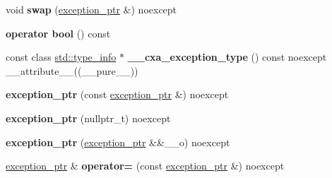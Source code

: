\begin{DoxyCompactItemize}
\item 
\hypertarget{classstd_1_1____exception__ptr_1_1exception__ptr_ad2b1448af31aeebd84f37b01322ce8b8}{void {\bfseries swap} (\hyperlink{classstd_1_1____exception__ptr_1_1exception__ptr}{exception\+\_\+ptr} \&) noexcept}\label{classstd_1_1____exception__ptr_1_1exception__ptr_ad2b1448af31aeebd84f37b01322ce8b8}

\item 
\hypertarget{classstd_1_1____exception__ptr_1_1exception__ptr_aea1a685ac3dc20da791647f4437117a7}{{\bfseries operator bool} () const }\label{classstd_1_1____exception__ptr_1_1exception__ptr_aea1a685ac3dc20da791647f4437117a7}

\item 
\hypertarget{classstd_1_1____exception__ptr_1_1exception__ptr_a0d0e52fc08e9ff94e5c93952a02a42db}{const class \hyperlink{classstd_1_1type__info}{std\+::type\+\_\+info} $\ast$ {\bfseries \+\_\+\+\_\+cxa\+\_\+exception\+\_\+type} () const noexcept \+\_\+\+\_\+attribute\+\_\+\+\_\+((\+\_\+\+\_\+pure\+\_\+\+\_\+))}\label{classstd_1_1____exception__ptr_1_1exception__ptr_a0d0e52fc08e9ff94e5c93952a02a42db}

\item 
\hypertarget{classstd_1_1____exception__ptr_1_1exception__ptr_a145c306627582b1267de080d7ed397bf}{{\bfseries exception\+\_\+ptr} (const \hyperlink{classstd_1_1____exception__ptr_1_1exception__ptr}{exception\+\_\+ptr} \&) noexcept}\label{classstd_1_1____exception__ptr_1_1exception__ptr_a145c306627582b1267de080d7ed397bf}

\item 
\hypertarget{classstd_1_1____exception__ptr_1_1exception__ptr_af9793421da4a90faafedbf20d77cbf3b}{{\bfseries exception\+\_\+ptr} (nullptr\+\_\+t) noexcept}\label{classstd_1_1____exception__ptr_1_1exception__ptr_af9793421da4a90faafedbf20d77cbf3b}

\item 
\hypertarget{classstd_1_1____exception__ptr_1_1exception__ptr_a482e4689f9f3dac849c15b849603a399}{{\bfseries exception\+\_\+ptr} (\hyperlink{classstd_1_1____exception__ptr_1_1exception__ptr}{exception\+\_\+ptr} \&\&\+\_\+\+\_\+o) noexcept}\label{classstd_1_1____exception__ptr_1_1exception__ptr_a482e4689f9f3dac849c15b849603a399}

\item 
\hypertarget{classstd_1_1____exception__ptr_1_1exception__ptr_ad65245e1b195812da895d36dbac98829}{\hyperlink{classstd_1_1____exception__ptr_1_1exception__ptr}{exception\+\_\+ptr} \& {\bfseries operator=} (const \hyperlink{classstd_1_1____exception__ptr_1_1exception__ptr}{exception\+\_\+ptr} \&) noexcept}\label{classstd_1_1____exception__ptr_1_1exception__ptr_ad65245e1b195812da895d36dbac98829}


\end{DoxyCompactItemize}
